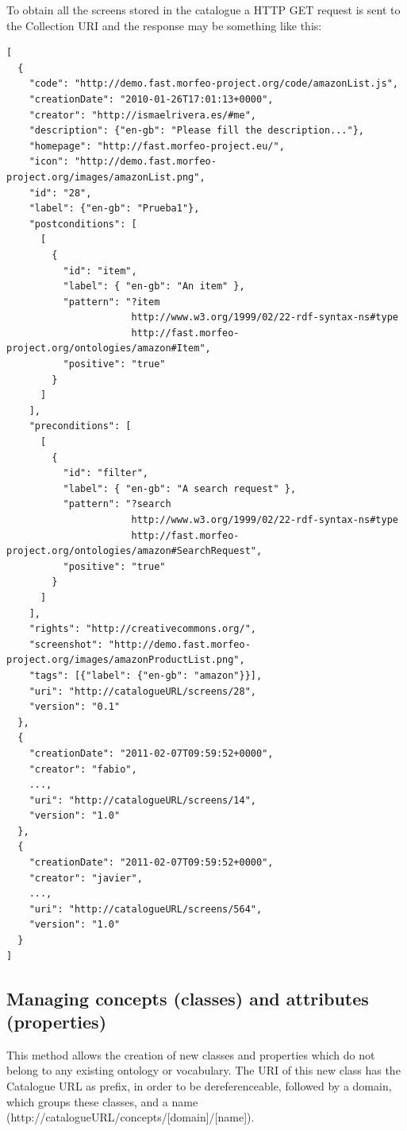 \documentclass{fast_latex}
\begin{document}
To obtain all the screens stored in the catalogue a HTTP GET request is sent to the Collection URI and the response may be something like this:

\singlespacing
\begin{verbatim}
[
  {
    "code": "http://demo.fast.morfeo-project.org/code/amazonList.js",
    "creationDate": "2010-01-26T17:01:13+0000",
    "creator": "http://ismaelrivera.es/#me",
    "description": {"en-gb": "Please fill the description..."},
    "homepage": "http://fast.morfeo-project.eu/",
    "icon": "http://demo.fast.morfeo-project.org/images/amazonList.png",
    "id": "28",
    "label": {"en-gb": "Prueba1"},
    "postconditions": [
      [
        {
          "id": "item",
          "label": { "en-gb": "An item" },
          "pattern": "?item
                      http://www.w3.org/1999/02/22-rdf-syntax-ns#type
                      http://fast.morfeo-project.org/ontologies/amazon#Item",
          "positive": "true"
        }
      ]
    ],
    "preconditions": [
      [
        {
          "id": "filter",
          "label": { "en-gb": "A search request" },
          "pattern": "?search
                      http://www.w3.org/1999/02/22-rdf-syntax-ns#type
                      http://fast.morfeo-project.org/ontologies/amazon#SearchRequest",
          "positive": "true"
        }
      ]
    ],
    "rights": "http://creativecommons.org/",
    "screenshot": "http://demo.fast.morfeo-project.org/images/amazonProductList.png",
    "tags": [{"label": {"en-gb": "amazon"}}],
    "uri": "http://catalogueURL/screens/28",
    "version": "0.1"
  },
  {
    "creationDate": "2011-02-07T09:59:52+0000",
    "creator": "fabio",
    ...,
    "uri": "http://catalogueURL/screens/14",
    "version": "1.0"
  },
  {
    "creationDate": "2011-02-07T09:59:52+0000",
    "creator": "javier",
    ...,
    "uri": "http://catalogueURL/screens/564",
    "version": "1.0"
  }
]
\end{verbatim}
\doublespacing


\subsection{Managing concepts (classes) and attributes (properties)} %
\label{sub:managing_concepts_attributes}

This method allows the creation of new classes and properties which do not belong to any existing ontology or vocabulary. The URI of this new class has the Catalogue URL as prefix, in order to be dereferenceable, followed by a domain, which groups these classes, and a name (http://catalogueURL/concepts/[domain]/[name]).
\end{document}
